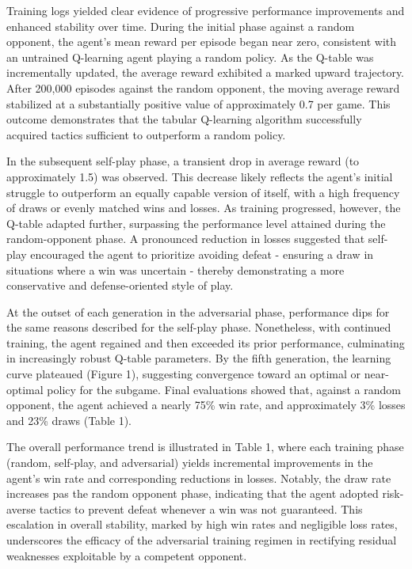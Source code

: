 \documentclass[10pt]{extarticle}
\begin{document}
Training logs yielded clear evidence of progressive performance improvements and enhanced stability over time. During the initial phase against a random opponent, the agent's mean reward per episode began near zero, consistent with an untrained Q-learning agent playing a random policy. As the Q-table was incrementally updated, the average reward exhibited a marked upward trajectory. After 200,000 episodes against the random opponent, the moving average reward stabilized at a substantially positive value of approximately 0.7 per game. This outcome demonstrates that the tabular Q-learning algorithm successfully acquired tactics sufficient to outperform a random policy.

In the subsequent self-play phase, a transient drop in average reward (to approximately 1.5) was observed. This decrease likely reflects the agent's initial struggle to outperform an equally capable version of itself, with a high frequency of draws or evenly matched wins and losses. As training progressed, however, the Q-table adapted further, surpassing the performance level attained during the random-opponent phase. A pronounced reduction in losses suggested that self-play encouraged the agent to prioritize avoiding defeat - ensuring a draw in situations where a win was uncertain - thereby demonstrating a more conservative and defense-oriented style of play.

At the outset of each generation in the adversarial phase, performance dips for the same reasons described for the self-play phase. Nonetheless, with continued training, the agent regained and then exceeded its prior performance, culminating in increasingly robust Q-table parameters. By the fifth generation, the learning curve plateaued (Figure 1), suggesting convergence toward an optimal or near-optimal policy for the subgame. Final evaluations showed that, against a random opponent, the agent achieved a nearly 75\% win rate, and approximately 3\% losses and 23\% draws (Table 1). 

The overall performance trend is illustrated in Table 1, where each training phase (random, self-play, and adversarial) yields incremental improvements in the agent's win rate and corresponding reductions in losses. Notably, the draw rate increases pas the random opponent phase, indicating that the agent adopted risk-averse tactics to prevent defeat whenever a win was not guaranteed. This escalation in overall stability, marked by high win rates and negligible loss rates, underscores the efficacy of the adversarial training regimen in rectifying residual weaknesses exploitable by a competent opponent.
\end{document}
